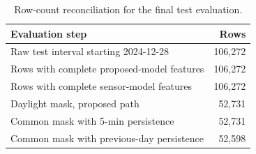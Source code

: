 \begin{table}[!t]
\caption{Row-count reconciliation for the final test evaluation.}
\label{tab:evaluation_filter_summary}
\centering
\small
\begin{tabular}{l r}
\toprule
Evaluation step & Rows \\
\midrule
Raw test interval starting 2024-12-28 & 106,272 \\
Rows with complete proposed-model features & 106,272 \\
Rows with complete sensor-model features & 106,272 \\
Daylight mask, proposed path & 52,731 \\
Common mask with 5-min persistence & 52,731 \\
Common mask with previous-day persistence & 52,598 \\
\bottomrule
\end{tabular}
\end{table}
